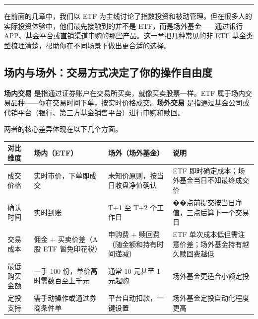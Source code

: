 \documentclass[a4paper,11pt,oneside,fontset=none,UTF8,zihao=-4]{ctexbook}
\begin{document}
\begin{center}{\color{dh-bronze}\rule{0.2\textwidth}{0.5pt}}\end{center}

在前面的几章中，我们以 ETF
为主线讨论了指数投资和被动管理。但在很多人的实际投资体验中，他们最先接触到的并不是
ETF，而是场外基金------通过银行
APP、基金平台或直销渠道申购的那些产品。这一章把几种常见的非 ETF
基金类型梳理清楚，帮助你在不同场景下做出更合适的选择。

\subsection{场内与场外：交易方式决定了你的操作自由度}\label{ux573aux5185ux4e0eux573aux5916ux4ea4ux6613ux65b9ux5f0fux51b3ux5b9aux4e86ux4f60ux7684ux64cdux4f5cux81eaux7531ux5ea6}

\textbf{场内交易} 是指通过证券账户在交易所买卖，就像买卖股票一样。ETF
属于场内交易品种------你在交易时间下单，按实时价格成交。\textbf{场外交易}
是指通过基金公司或代销平台（银行、第三方基金销售平台）进行申购和赎回。

两者的核心差异体现在以下几个方面。

\begin{longtable}[]{@{}
  >{\raggedright\arraybackslash}p{}
  >{\raggedright\arraybackslash}p{}
  >{\raggedright\arraybackslash}p{}
  >{\raggedright\arraybackslash}p{}@{}}
\toprule\noalign{}\rowcolor{dh-pink!25}
\begin{minipage}[b]{\linewidth}\raggedright
对比维度
\end{minipage} & \begin{minipage}[b]{\linewidth}\raggedright
场内（ETF）
\end{minipage} & \begin{minipage}[b]{\linewidth}\raggedright
场外（场外基金）
\end{minipage} & \begin{minipage}[b]{\linewidth}\raggedright
说明
\end{minipage} \\
\midrule\noalign{}
\endhead
\bottomrule\noalign{}
\endlastfoot
成交价格 & 实时市价，下单即成交 & 未知价原则，按当日收盘净值确认 & ETF
即时确定成本；场外基金当日不知最终成交价 \\
确认时间 & 实时到账 & T+1 至 T+2 个工作日 &
��点前提交按当日净值，三点后算下一个交易日 \\
交易成本 & 佣金 + 买卖价差（A 股 ETF 暂免印花税） & 申购费 +
赎回费（随金额和持有时间递减） & ETF
单次成本低但需注意价差；场外基金持有越久赎回费越低 \\
最低购买金额 & 一手 100 份，单价高时需数百至上千元 & 通常 10 元甚至 1
元起购 & 场外基金更适合小额定投 \\
定投支持 & 需手动操作或通过券商条件单 & 平台自动扣款，一键设置 &
场外基金定投自动化程度更高 \\
\end{longtable}
\end{document}
